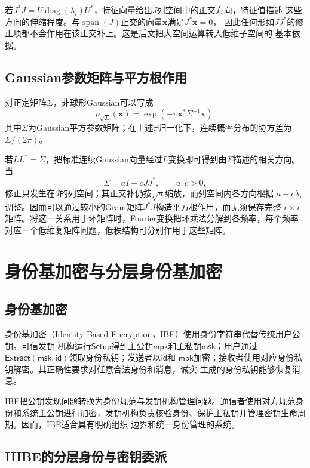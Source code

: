 \begin{mathchapterlayout}
若$J^*J=U\operatorname{diag}(\lambda_i)U^*$，特征向量给出$J$列空间中的正交方向，特征值描述
这些方向的伸缩程度。与$\operatorname{span}(J)$正交的向量$\mathbf x$满足$J^*\mathbf x=0$，
因此任何形如$JJ^*$的修正项都不会作用在该正交补上。这是后文把大空间运算转入低维子空间的
基本依据。

\subsection{Gaussian参数矩阵与平方根作用}

对正定矩阵$\Sigma$，非球形Gaussian可以写成
\[
 \rho_{\sqrt\Sigma}(\mathbf x)
 =\exp(-\pi\mathbf x^*\Sigma^{-1}\mathbf x).
\]
其中$\Sigma$为Gaussian平方参数矩阵；在上述$\pi$归一化下，连续概率分布的协方差为$\Sigma/(2\pi)$。

若$L L^*=\Sigma$，把标准连续Gaussian向量经过$L$变换即可得到由$\Sigma$描述的相关方向。
当
\[
 \Sigma=aI-cJJ^*,\qquad a,c>0,
\]
修正只发生在$J$的列空间；其正交补仍按$\sqrt a$缩放，而列空间内各方向根据
$a-c\lambda_i$调整。因而可以通过较小的Gram矩阵$J^*J$构造平方根作用，而无须保存完整
$r\times r$矩阵。将这一关系用于环矩阵时，Fourier变换把环乘法分解到各频率，每个频率
对应一个低维复矩阵问题，低秩结构可分别作用于这些矩阵。

\section{身份基加密与分层身份基加密}

\subsection{身份基加密}

身份基加密（Identity-Based Encryption，IBE）使用身份字符串代替传统用户公钥。可信发钥
机构运行$\mathsf{Setup}$得到主公钥$\mathsf{mpk}$和主私钥$\mathsf{msk}$；用户通过
$\mathsf{Extract}(\mathsf{msk},\mathsf{id})$领取身份私钥；发送者以$\mathsf{id}$和
$\mathsf{mpk}$加密；接收者使用对应身份私钥解密。其正确性要求对任意合法身份和消息，诚实
生成的身份私钥能够恢复消息。

IBE把公钥发现问题转换为身份规范与发钥机构管理问题。通信者使用对方规范身份和系统主公钥进行加密，发钥机构负责核验身份、保护主私钥并管理密钥生命周期。因而，IBE适合具有明确组织
边界和统一身份管理的系统。

\subsection{HIBE的分层身份与密钥委派}


\end{mathchapterlayout}
